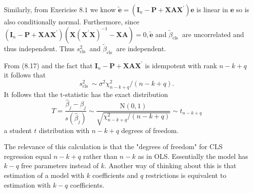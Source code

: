 \documentclass[10pt]{article}
\begin{document}
Similarly, from Exericise $8.1$ we know $\widetilde{\boldsymbol{e}}=\left(\boldsymbol{I}_{n}-\boldsymbol{P}+\boldsymbol{X} \boldsymbol{A} \boldsymbol{X}^{\prime}\right) \boldsymbol{e}$ is linear in $\boldsymbol{e}$ so is also conditionally normal. Furthermore, since $\left(\boldsymbol{I}_{n}-\boldsymbol{P}+\boldsymbol{X} \boldsymbol{A} \boldsymbol{X}^{\prime}\right)\left(\boldsymbol{X}\left(\boldsymbol{X}^{\prime} \boldsymbol{X}\right)^{-1}-\boldsymbol{X} \boldsymbol{A}\right)=0, \widetilde{\boldsymbol{e}}$ and $\widetilde{\beta}_{\text {cls }}$ are uncorrelated and thus independent. Thus $s_{\text {cls }}^{2}$ and $\widetilde{\beta}_{\text {cls }}$ are independent.

From (8.17) and the fact that $\boldsymbol{I}_{n}-\boldsymbol{P}+\boldsymbol{X} \boldsymbol{A} \boldsymbol{X}^{\prime}$ is idempotent with rank $n-k+q$ it follows that
$$
s_{\text {cls }}^{2} \sim \sigma^{2} \chi_{n-k+q}^{2} /(n-k+q) .
$$
It follows that the $\mathrm{t}$-statistic has the exact distribution
$$
T=\frac{\widehat{\beta}_{j}-\beta_{j}}{s\left(\widehat{\beta}_{j}\right)} \sim \frac{\mathrm{N}(0,1)}{\sqrt{\chi_{n-k+q}^{2} /(n-k+q)}} \sim t_{n-k+q}
$$
a student $t$ distribution with $n-k+q$ degrees of freedom.

The relevance of this calculation is that the "degrees of freedom" for CLS regression equal $n-k+q$ rather than $n-k$ as in OLS. Essentially the model has $k-q$ free parameters instead of $k$. Another way of thinking about this is that estimation of a model with $k$ coefficients and $q$ restrictions is equivalent to estimation with $k-q$ coefficients.
\end{document}
